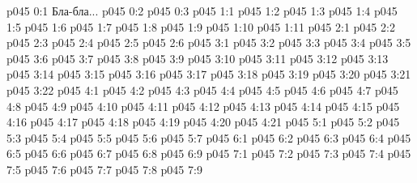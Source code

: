\author{Мелхиседек}
\vs p045 0:1  Бла-бла...
\vs p045 0:2 
\vs p045 0:3 
\vs p045 1:1 
\vs p045 1:2 \pc 
\vs p045 1:3 \pc 
\vs p045 1:4 
\vs p045 1:5 \pc 
\vs p045 1:6 \pc 
\vs p045 1:7 \pc 
\vs p045 1:8 \pc 
\vs p045 1:9 \pc 
\vs p045 1:10 
\vs p045 1:11 
\vs p045 2:1 
\vs p045 2:2 
\vs p045 2:3 \pc 
\vs p045 2:4 \pc 
\vs p045 2:5 
\vs p045 2:6 
\vs p045 3:1 
\vs p045 3:2 
\vs p045 3:3 
\vs p045 3:4 
\vs p045 3:5 
\vs p045 3:6 
\vs p045 3:7 
\vs p045 3:8 
\vs p045 3:9 \pc 
\vs p045 3:10 
\vs p045 3:11 
\vs p045 3:12 
\vs p045 3:13 
\vs p045 3:14 
\vs p045 3:15 
\vs p045 3:16 
\vs p045 3:17 
\vs p045 3:18 
\vs p045 3:19 
\vs p045 3:20 
\vs p045 3:21 
\vs p045 3:22 \pc 
{}
\vs p045 4:1 
\vs p045 4:2 
\vs p045 4:3 
\vs p045 4:4 
\vs p045 4:5 
\vs p045 4:6 
\vs p045 4:7 
\vs p045 4:8 
\vs p045 4:9 
\vs p045 4:10 
\vs p045 4:11 
\vs p045 4:12 
\vs p045 4:13 
\vs p045 4:14 
\vs p045 4:15 
\vs p045 4:16 
\vs p045 4:17 
\vs p045 4:18 
\vs p045 4:19 \pc 
\vs p045 4:20 
\vs p045 4:21 
\vs p045 5:1 
\vs p045 5:2 
\vs p045 5:3 
\vs p045 5:4 \pc 
\vs p045 5:5 \pc 
\vs p045 5:6 
\vs p045 5:7 
\vs p045 6:1 
\vs p045 6:2 
\vs p045 6:3 
\vs p045 6:4 \pc 
\vs p045 6:5 
\vs p045 6:6 
\vs p045 6:7 \pc 
\vs p045 6:8 
\vs p045 6:9 
\vs p045 7:1 
\vs p045 7:2 
\vs p045 7:3 
\vs p045 7:4 
\vs p045 7:5 \pc 
\vs p045 7:6 
\vs p045 7:7 
\vs p045 7:8 \pc 
\vsetoff
\vs p045 7:9 
\quizlink
